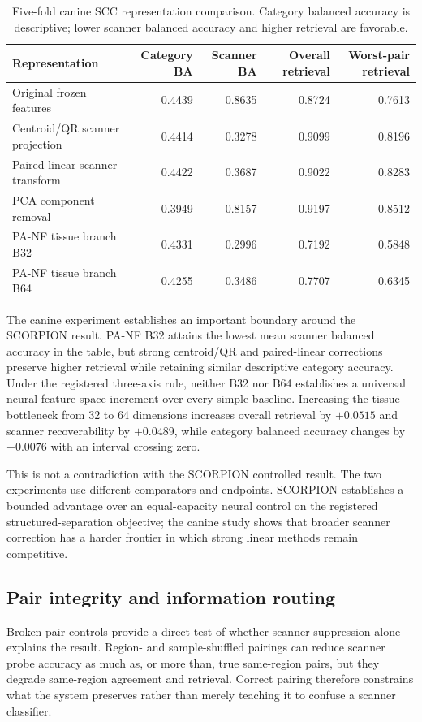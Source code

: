 \begin{table}[t]
\centering
\caption{Five-fold canine SCC representation comparison. Category balanced accuracy is descriptive; lower scanner balanced accuracy and higher retrieval are favorable.}
\label{tab:canine}
\small
\begin{tabular}{lrrrr}
\toprule
Representation & Category BA & Scanner BA & Overall retrieval & Worst-pair retrieval \\
\midrule
Original frozen features & 0.4439 & 0.8635 & 0.8724 & 0.7613 \\
Centroid/QR scanner projection & 0.4414 & 0.3278 & 0.9099 & 0.8196 \\
Paired linear scanner transform & 0.4422 & 0.3687 & 0.9022 & 0.8283 \\
PCA component removal & 0.3949 & 0.8157 & 0.9197 & 0.8512 \\
PA-NF tissue branch B32 & 0.4331 & 0.2996 & 0.7192 & 0.5848 \\
PA-NF tissue branch B64 & 0.4255 & 0.3486 & 0.7707 & 0.6345 \\
\bottomrule
\end{tabular}
\end{table}

The canine experiment establishes an important boundary around the SCORPION result. PA-NF B32 attains the lowest mean scanner balanced accuracy in the table, but strong centroid/QR and paired-linear corrections preserve higher retrieval while retaining similar descriptive category accuracy. Under the registered three-axis rule, neither B32 nor B64 establishes a universal neural feature-space increment over every simple baseline. Increasing the tissue bottleneck from 32 to 64 dimensions increases overall retrieval by $+0.0515$ and scanner recoverability by $+0.0489$, while category balanced accuracy changes by $-0.0076$ with an interval crossing zero.

This is not a contradiction with the SCORPION controlled result. The two experiments use different comparators and endpoints. SCORPION establishes a bounded advantage over an equal-capacity neural control on the registered structured-separation objective; the canine study shows that broader scanner correction has a harder frontier in which strong linear methods remain competitive.

\subsection{Pair integrity and information routing}
Broken-pair controls provide a direct test of whether scanner suppression alone explains the result. Region- and sample-shuffled pairings can reduce scanner probe accuracy as much as, or more than, true same-region pairs, but they degrade same-region agreement and retrieval. Correct pairing therefore constrains what the system preserves rather than merely teaching it to confuse a scanner classifier.

